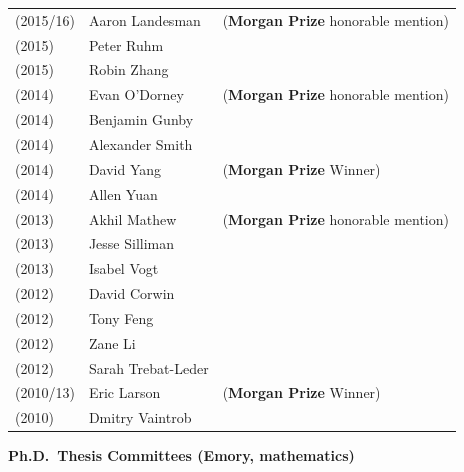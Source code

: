 \documentclass[margin,line]{res}
\begin{document}
\begin{resume}
\begin{tabular}{lll}
(2015/16) & Aaron Landesman & (\textbf{Morgan Prize} honorable mention)      \\
(2015) & Peter Ruhm & \\
(2015) & Robin Zhang & \\

(2014) & Evan O'Dorney    & (\textbf{Morgan Prize} honorable mention) \\
(2014) & Benjamin Gunby & \\
(2014) & Alexander Smith & \\
(2014) & David Yang & (\textbf{Morgan Prize} Winner)  \\
(2014) & Allen Yuan & \\

(2013) & Akhil Mathew  & (\textbf{Morgan Prize} honorable mention)  \\
(2013) & Jesse Silliman & \\
(2013) & Isabel Vogt & \\

(2012) & David Corwin & \\
(2012) & Tony Feng & \\
(2012) & Zane Li & \\
(2012) & Sarah Trebat-Leder & \\

(2010/13) & Eric Larson  & (\textbf{Morgan Prize} Winner) \\
(2010) & Dmitry Vaintrob & \\
\end{tabular}




{\bf Ph.D.~Thesis Committees (Emory, mathematics)}
\vspace*{-.15in}


\end{resume}
\end{document}
